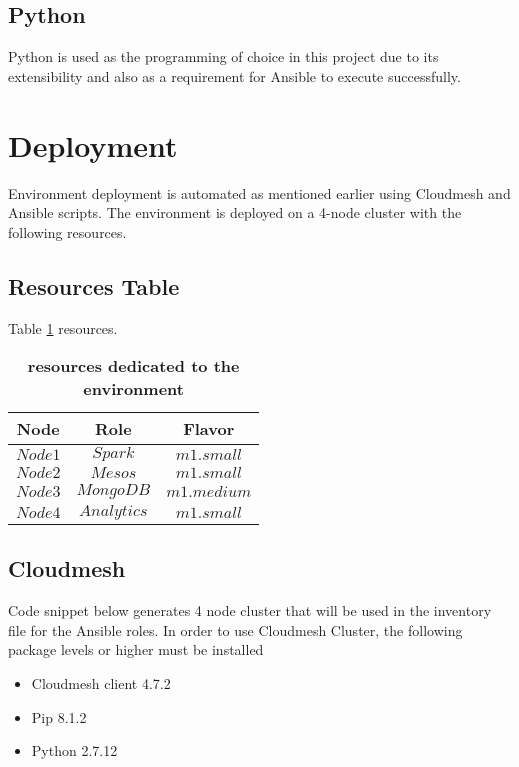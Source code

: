 \documentclass[9pt,twocolumn,twoside]{../../styles/osajnl}
\begin{document}
\subsection{Python}

Python is used as the programming of choice in this project due to its
extensibility and also as a requirement for Ansible to execute
successfully.


\section{Deployment}

Environment deployment is automated as mentioned earlier using
Cloudmesh and Ansible scripts. The environment is deployed on a 4-node
cluster with the following resources.

\subsection{Resources Table}

Table \ref{tab:shape-functions} resources.

\begin{table}[htbp]
\centering
\caption{\bf resources dedicated to the environment}
\begin{tabular}{ccc}
\hline
Node & Role & Flavor  \\
\hline
$Node 1$ & $Spark$ & $m1.small$ \\
$Node 2$ & $Mesos$ & $m1.small$ \\
$Node 3$ & $MongoDB$ & $m1.medium$ \\
$Node 4$ & $Analytics$ & $m1.small$ \\
\hline
\end{tabular}
  \label{tab:shape-functions}
\end{table}

\subsection{Cloudmesh}
Code snippet below generates 4 node cluster that will be used in the
inventory file for the Ansible roles. In order to use Cloudmesh
Cluster, the following package levels or higher must be installed
\begin{itemize}
\item Cloudmesh client 4.7.2
\item Pip 8.1.2
\item Python 2.7.12  
\end{itemize}
\end{document}
